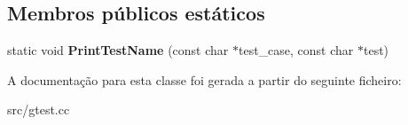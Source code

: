 \subsection*{Membros públicos estáticos}
\begin{DoxyCompactItemize}
\item 
\hypertarget{classtesting_1_1internal_1_1PrettyUnitTestResultPrinter_a5b60a9aed1db02837b11450f6e8d0f71}{static void {\bfseries Print\-Test\-Name} (const char $\ast$test\-\_\-case, const char $\ast$test)}\label{classtesting_1_1internal_1_1PrettyUnitTestResultPrinter_a5b60a9aed1db02837b11450f6e8d0f71}

\end{DoxyCompactItemize}


A documentação para esta classe foi gerada a partir do seguinte ficheiro\-:\begin{DoxyCompactItemize}
\item 
src/gtest.\-cc\end{DoxyCompactItemize}
